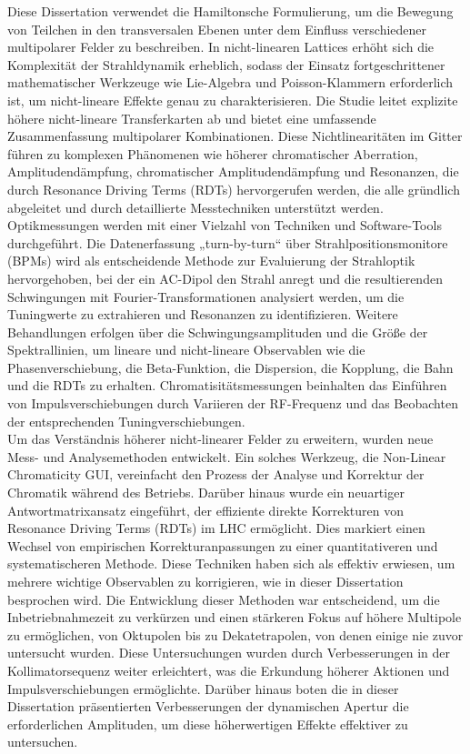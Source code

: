 {%
Diese Dissertation verwendet die Hamiltonsche Formulierung, um die Bewegung von Teilchen in den transversalen Ebenen unter dem Einfluss verschiedener multipolarer Felder zu beschreiben. In nicht-linearen Lattices erhöht sich die Komplexität der Strahldynamik erheblich, sodass der Einsatz fortgeschrittener mathematischer Werkzeuge wie Lie-Algebra und Poisson-Klammern erforderlich ist, um nicht-lineare Effekte genau zu charakterisieren. Die Studie leitet explizite höhere nicht-lineare Transferkarten ab und bietet eine umfassende Zusammenfassung multipolarer Kombinationen. Diese Nichtlinearitäten im Gitter führen zu komplexen Phänomenen wie höherer chromatischer Aberration, Amplitudendämpfung, chromatischer Amplitudendämpfung und Resonanzen, die durch Resonance Driving Terms (RDTs) hervorgerufen werden, die alle gründlich abgeleitet und durch detaillierte Messtechniken unterstützt werden.
\\
\indent
Optikmessungen werden mit einer Vielzahl von Techniken und Software-Tools durchgeführt. Die Datenerfassung „turn-by-turn“ über Strahlpositionsmonitore (BPMs) wird als entscheidende Methode zur Evaluierung der Strahloptik hervorgehoben, bei der ein AC-Dipol den Strahl anregt und die resultierenden Schwingungen mit Fourier-Transformationen analysiert werden, um die Tuningwerte zu extrahieren und Resonanzen zu identifizieren. Weitere Behandlungen erfolgen über die Schwingungsamplituden und die Größe der Spektrallinien, um lineare und nicht-lineare Observablen wie die Phasenverschiebung, die Beta-Funktion, die Dispersion, die Kopplung, die Bahn und die RDTs zu erhalten. Chromatisitätsmessungen beinhalten das Einführen von Impulsverschiebungen durch Variieren der RF-Frequenz und das Beobachten der entsprechenden Tuningverschiebungen.
\\
\indent
Um das Verständnis höherer nicht-linearer Felder zu erweitern, wurden neue Mess- und Analysemethoden entwickelt. Ein solches Werkzeug, die Non-Linear Chromaticity GUI, vereinfacht den Prozess der Analyse und Korrektur der Chromatik während des Betriebs. Darüber hinaus wurde ein neuartiger Antwortmatrixansatz eingeführt, der effiziente direkte Korrekturen von Resonance Driving Terms (RDTs) im LHC ermöglicht. Dies markiert einen Wechsel von empirischen Korrekturanpassungen zu einer quantitativeren und systematischeren Methode. Diese Techniken haben sich als effektiv erwiesen, um mehrere wichtige Observablen zu korrigieren, wie in dieser Dissertation besprochen wird. Die Entwicklung dieser Methoden war entscheidend, um die Inbetriebnahmezeit zu verkürzen und einen stärkeren Fokus auf höhere Multipole zu ermöglichen, von Oktupolen bis zu Dekatetrapolen, von denen einige nie zuvor untersucht wurden. Diese Untersuchungen wurden durch Verbesserungen in der Kollimatorsequenz weiter erleichtert, was die Erkundung höherer Aktionen und Impulsverschiebungen ermöglichte. Darüber hinaus boten die in dieser Dissertation präsentierten Verbesserungen der dynamischen Apertur die erforderlichen Amplituden, um diese höherwertigen Effekte effektiver zu untersuchen.

}
